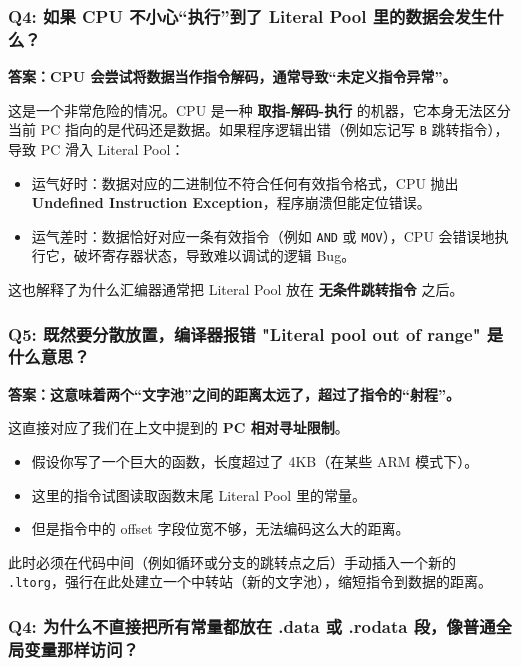 \newpage




\subsubsection{Q4: 如果 CPU 不小心“执行”到了 Literal Pool 里的数据会发生什么？}

\textbf{答案：CPU 会尝试将数据当作指令解码，通常导致“未定义指令异常”。}

\vspace{1em}

这是一个非常危险的情况。CPU 是一种 \textbf{取指-解码-执行} 的机器，它本身无法区分当前 PC 指向的是代码还是数据。如果程序逻辑出错（例如忘记写 \texttt{B} 跳转指令），导致 PC 滑入 Literal Pool：
\begin{itemize}
    \item 运气好时：数据对应的二进制位不符合任何有效指令格式，CPU 抛出 \textbf{Undefined Instruction Exception}，程序崩溃但能定位错误。
    \item 运气差时：数据恰好对应一条有效指令（例如 \texttt{AND} 或 \texttt{MOV}），CPU 会错误地执行它，破坏寄存器状态，导致难以调试的逻辑 Bug。
\end{itemize}
这也解释了为什么汇编器通常把 Literal Pool 放在 \textbf{无条件跳转指令} 之后。


\subsubsection{Q5: 既然要分散放置，编译器报错 "Literal pool out of range" 是什么意思？}

\textbf{答案：这意味着两个“文字池”之间的距离太远了，超过了指令的“射程”。}

\vspace{1em}

这直接对应了我们在上文中提到的 \textbf{PC 相对寻址限制}。
\begin{itemize}
    \item 假设你写了一个巨大的函数，长度超过了 4KB（在某些 ARM 模式下）。
    \item 这里的指令试图读取函数末尾 Literal Pool 里的常量。
    \item 但是指令中的 offset 字段位宽不够，无法编码这么大的距离。
\end{itemize}
此时必须在代码中间（例如循环或分支的跳转点之后）手动插入一个新的 \texttt{.ltorg}，强行在此处建立一个中转站（新的文字池），缩短指令到数据的距离。

\subsubsection{Q4: 为什么不直接把所有常量都放在 .data 或 .rodata 段，像普通全局变量那样访问？}

